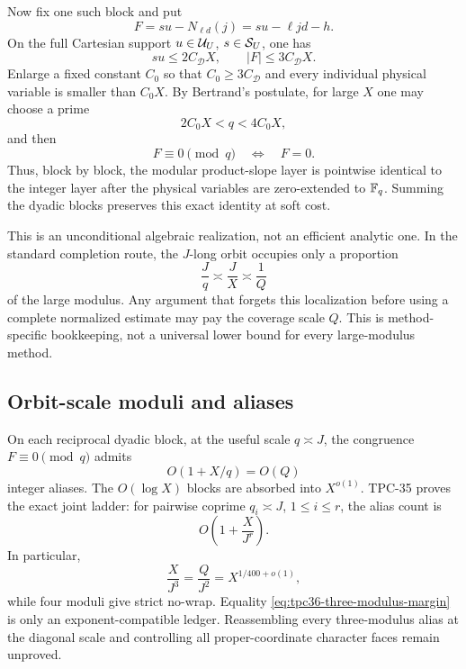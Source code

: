 Now fix one such block and put
\begin{equation}
 F=s u-N_{\ell d}(j)=s u-\ell jd-h.
 \label{eq:tpc36-affine-determinant}
\end{equation}
On the full Cartesian support
\(u\in\mathcal U_U\), \(s\in\mathcal S_U\), one has
\begin{equation}
 su\le2C_{\mathscr D}X,
 \qquad
 |F|\le3C_{\mathscr D}X.
 \label{eq:tpc36-block-determinant-bound}
\end{equation}
Enlarge a fixed constant \(C_0\) so that
\(C_0\ge3C_{\mathscr D}\) and every individual physical variable is
smaller than \(C_0X\).  By Bertrand's postulate, for large \(X\) one may
choose a prime
\begin{equation}
 2C_0X<q<4C_0X,
 \label{eq:tpc36-large-modulus}
\end{equation}
and then
\begin{equation}
 F\equiv0\pmod q\quad\Longleftrightarrow\quad F=0.
 \label{eq:tpc36-large-modulus-no-alias}
\end{equation}
Thus, block by block, the modular product-slope layer is pointwise
identical to the integer layer after the physical variables are
zero-extended to \(\mathbb F_q\).  Summing the dyadic blocks preserves this exact
identity at soft cost.

This is an unconditional algebraic realization, not an efficient analytic
one.  In the standard completion route, the \(J\)-long orbit occupies only
a proportion
\begin{equation}
 \frac Jq\asymp\frac JX\asymp\frac1Q
 \label{eq:tpc36-large-modulus-coverage}
\end{equation}
of the large modulus.  Any argument that forgets this localization before
using a complete normalized estimate may pay the coverage scale \(Q\).
This is method-specific bookkeeping, not a universal lower bound for every
large-modulus method.

\subsection{Orbit-scale moduli and aliases}

On each reciprocal dyadic block, at the useful scale \(q\asymp J\), the
congruence \(F\equiv0\pmod q\) admits
\begin{equation}
 O(1+X/q)=O(Q)
 \label{eq:tpc36-one-modulus-aliases}
\end{equation}
integer aliases.  The \(O(\log X)\) blocks are absorbed into \(X^{o(1)}\).
TPC-35 proves the exact joint ladder: for pairwise
coprime \(q_i\asymp J\), \(1\le i\le r\), the alias count is
\begin{equation}
 O\!\left(1+\frac X{J^r}\right).
 \label{eq:tpc36-CRT-alias-ladder}
\end{equation}
In particular,
\begin{equation}
 \frac X{J^3}=\frac Q{J^2}=X^{1/400+o(1)},
 \label{eq:tpc36-three-modulus-margin}
\end{equation}
while four moduli give strict no-wrap.  Equality
\eqref{eq:tpc36-three-modulus-margin} is only an exponent-compatible
ledger.  Reassembling every three-modulus alias at the diagonal scale and
controlling all proper-coordinate character faces remain unproved.

